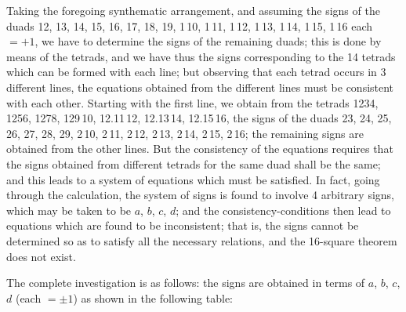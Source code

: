 \documentclass[11pt,a4paper]{book}
\begin{document}
\newpage
Taking the foregoing synthematic arrangement, and assuming the signs of the duads 12, 13, 14, 15, 16, 17, 18, 19, 1\,10, 1\,11, 1\,12, 1\,13, 1\,14, 1\,15, 1\,16 each $= +1$, we have to determine the signs of the remaining duads; this is done by means of the tetrads, and we have thus the signs corresponding to the 14 tetrads which can be formed with each line; but observing that each tetrad occurs in 3 different lines, the equations obtained from the different lines must be consistent with each other. Starting with the first line, we obtain from the tetrads 1234, 1256, 1278, 129\,10, 12.11\,12, 12.13\,14, 12.15\,16, the signs of the duads 23, 24, 25, 26, 27, 28, 29, 2\,10, 2\,11, 2\,12, 2\,13, 2\,14, 2\,15, 2\,16; the remaining signs are obtained from the other lines. But the consistency of the equations requires that the signs obtained from different tetrads for the same duad shall be the same; and this leads to a system of equations which must be satisfied. In fact, going through the calculation, the system of signs is found to involve 4 arbitrary signs, which may be taken to be $a$, $b$, $c$, $d$; and the consistency-conditions then lead to equations which are found to be inconsistent; that is, the signs cannot be determined so as to satisfy all the necessary relations, and the 16-square theorem does not exist.

The complete investigation is as follows: the signs are obtained in terms of $a$, $b$, $c$, $d$ (each $= \pm 1$) as shown in the following table:
\end{document}
